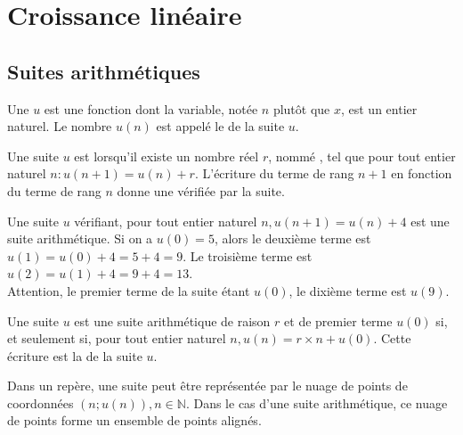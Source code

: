 \chapter{Croissance linéaire}
\thispagestyle{fancy}

\section{Suites arithmétiques}

\begin{bdefi}
	Une  $u$ est une fonction dont la variable, notée $n$ plutôt que $x$, est un entier naturel. Le nombre $u(n)$ est appelé le  de la suite $u$.
\end{bdefi}

\begin{bdefis}
	Une suite $u$ est  lorsqu'il existe un nombre réel $r$, nommé , tel que pour tout entier naturel $n: u(n+1)=u(n)+r$. L'écriture du terme de rang $n+1$ en fonction du terme de rang $n$ donne une  vérifiée par la suite.
\end{bdefis}

\begin{bexemple}
Une suite $u$ vérifiant, pour tout entier naturel $n, u(n+1)=u(n)+4$ est une suite arithmétique. Si on a $u(0)=5$, alors le deuxième terme est $u(1)=u(0)+4=5+4=9$. Le troisième terme est $u(2)=u(1)+4=9+4=13$.\\
Attention, le premier terme de la suite étant $u(0)$, le dixième terme est $u(9)$.
\end{bexemple}

\begin{bprop}
	Une suite $u$ est une suite arithmétique de raison $r$ et de premier terme $u(0)$ si, et seulement si, pour tout entier naturel $n, u(n)=r \times n+u(0)$. Cette écriture est la  de la suite $u$.
\end{bprop}

\begin{bprop}
	Dans un repère, une suite peut être représentée par le nuage de points de coordonnées $(n ; u(n)), n \in \mathbb{N}$. Dans le cas d'une suite arithmétique, ce nuage de points forme un ensemble de points alignés.
\end{bprop}

